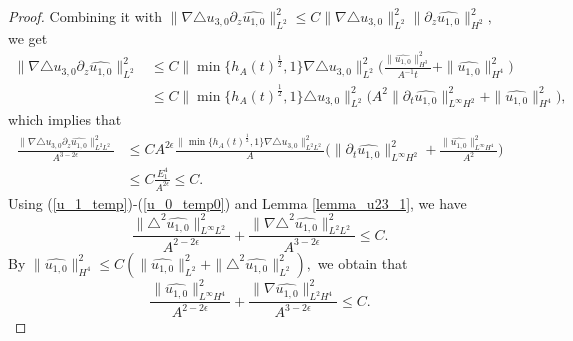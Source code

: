 \documentclass[12pt, reqno]{amsart}
\numberwithin{equation}{section}
\begin{document}
\begin{proof}
		Combining it with  $\|\nabla\triangle u_{3,0}\partial_z\widehat{u_{1,0}}\|^2_{L^2}\leq 
		C\|\nabla\triangle u_{3,0}\|^2_{L^2}\|\partial_z\widehat{u_{1,0}}\|^2_{H^2},$
		we get
		\begin{equation*}
			\begin{aligned}
				\|\nabla\triangle u_{3,0}\partial_z\widehat{u_{1,0}}\|^2_{L^2}
				&\leq C\|\min\{h_A(t)^{\frac{1}{2}},1\}\nabla\triangle u_{3,0}\|^2_{L^2}
				\Big(\frac{\|\widehat{u_{1,0}}\|^2_{H^3}}{A^{-1}t}
				+\|\widehat{u_{1,0}}\|^2_{H^4}\Big)\\
				&\leq C\|\min\{h_A(t)^{\frac{1}{2}},1\}\triangle u_{3,0}\|^2_{L^2}
				\Big(A^2\|\partial_t\widehat{u_{1,0}}\|^2_{L^{\infty}H^2}
				+\|\widehat{u_{1,0}}\|^2_{H^4}\Big),
			\end{aligned}
		\end{equation*}
		which implies that 
		\begin{equation}\label{u_0_temp0}
			\begin{aligned}			
				\frac{\|\nabla\triangle u_{3,0}\partial_z\widehat{u_{1,0}}\|^2_{L^{2}L^2}}{A^{3-2\epsilon}}
				&\leq CA^{2\epsilon}\frac{\|\min\{h_A(t)^{\frac{1}{2}},1\}
					\nabla\triangle u_{3,0}\|^2_{L^{2}L^2}}{A}
				\Big(\|\partial_t\widehat{u_{1,0}}\|^2_{L^{\infty}H^2}
				+\frac{\|\widehat{u_{1,0}}\|^2_{L^{\infty}H^4}}{A^2}\Big)\\
				&\leq C\frac{E_1^4}{A^{2\epsilon}}\leq C.
			\end{aligned}
		\end{equation}
		Using (\ref{u_1_temp})-(\ref{u_0_temp0}) and Lemma \ref{lemma_u23_1}, we have
		$$\frac{\|\triangle^2\widehat{u_{1,0}}\|^2_{L^{\infty}L^2}}{A^{2-2\epsilon}}+\frac{\|\nabla\triangle^2\widehat{u_{1,0}}\|^2_{L^{2}L^2}}{A^{3-2\epsilon}}
		\leq C.$$
		By $\|\widehat{u_{1,0}}\|^2_{H^4}
		\leq C(\|\widehat{u_{1,0}}\|^2_{L^2}+\|\triangle^2\widehat{u_{1,0}}\|^2_{L^2}),$
		we obtain that 
		\begin{equation}\label{u_1_result2}
			\frac{\|\widehat{u_{1,0}}\|^2_{L^{\infty}H^4}}{A^{2-2\epsilon}}
			+\frac{\|\nabla\widehat{u_{1,0}}\|^2_{L^{2}H^4}}{A^{3-2\epsilon}}
			\leq C.
		\end{equation}
		

\end{proof}
\end{document}
